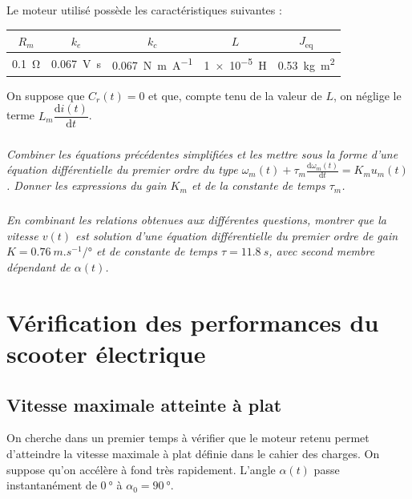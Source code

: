 \documentclass[10pt,fleqn]{article} %
\begin{document}
\begin{multicols}{2}
Le moteur utilisé possède les caractéristiques suivantes :
\begin{center}
\noindent \begin{tabular}{|*5{c|}}
\hline
$R_m$&$k_e$&$k_c$&$L$&$J_{\text{eq}}$ \\ \hline
\SI{0.1}{\ohm} & \SI{0.067}{V.s} & \SI{0.067}{N.m.A^{-1}} & \SI{1e-5}{H} & \SI {0.53}{kg.m^2} \\ \hline
\end{tabular}
\end{center}


On suppose que $C_r(t)=0$ et que, compte tenu de la valeur de $L$, on néglige le terme $L_m\dfrac{\text{d}i(t)}{\text{d}t}$.


\subparagraph{}\textit{Combiner les équations précédentes simplifiées et les mettre sous la forme d'une équation différentielle du premier ordre du type $\omega_m(t) + \tau_m \frac{\text{d}\omega_m(t)}{\text{d}t}= K_m u_m (t)$. Donner les expressions du gain $K_m$ et de la constante de temps $\tau_m$.}


\subparagraph{}\textit{En combinant les relations obtenues aux différentes questions, montrer que la vitesse $v(t)$ est solution d'une équation différentielle du premier ordre de gain $K=\SI{0.76}{m.s^{-1}/\degree}$ et de constante de temps $\tau=\SI{11.8}{s}$, avec second membre dépendant de $\alpha(t)$.}


\section*{Vérification des performances du scooter électrique }

\subsection*{Vitesse maximale atteinte à plat}



On cherche dans un premier temps à vérifier que le moteur retenu permet d'atteindre la vitesse maximale à plat définie dans le cahier des charges.  On suppose qu'on accélère à fond très rapidement. L'angle $\alpha(t)$ passe instantanément de $\SI{0}{\degree}$ à  $\alpha_0=\SI{90}{\degree}$.



\end{multicols}
\end{document}
